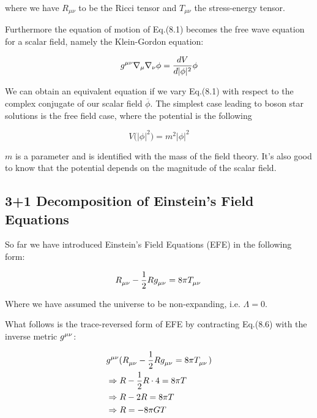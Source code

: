\documentclass[12pt]{article}
\numberwithin{equation}{section}
\numberwithin{theorem}{subsection}
\begin{document}
where we have $R_{\mu\nu}$ to be the Ricci tensor and $T_{\mu\nu}$ the stress-energy tensor.

\newline

Furthermore the equation of motion of Eq.(8.1) becomes the free wave equation for a scalar field, namely the Klein-Gordon equation:

\begin{equation}

    \tensor{g}{^\mu^\nu}\nabla_{\mu}\nabla_{\nu}\phi = \frac{dV}{d|\phi|^{2}}\phi

\end{equation}

We can obtain an equivalent equation if we vary Eq.(8.1) with respect to the complex conjugate of our scalar field $\overline{\phi}$. The simplest case leading to boson star solutions is the free field case, where the potential is the following

\begin{equation}

    V\big(|\phi|^{2} \big) = m^{2}|\phi|^{2}

\end{equation}

$m$ is a parameter and is identified with the mass of the field theory. It's also good to know that the potential depends on the magnitude of the scalar field.


\subsection{3+1 Decomposition of Einstein's Field Equations} So far we have introduced Einstein's Field Equations (EFE) in the following form:

\begin{equation}

    \tensor{R}{_\mu_\nu}-\frac{1}{2}R\tensor{g}{_\mu_\nu}=8\pi \tensor{T}{_\mu_\nu}

\end{equation}

Where we have assumed the universe to be non-expanding, i.e. $\Lambda = 0$.

What follows is the trace-reversed form of EFE by contracting Eq.(8.6) with the inverse metric $\tensor{g}{^\mu^\nu}$:

\begin{align}

    &\tensor{g}{^\mu^\nu}(\tensor{R}{_\mu_\nu}-\frac{1}{2}R\tensor{g}{_\mu_\nu} = 8\pi \tensor{T}{_\mu_\nu}) \notag \\

    &\Rightarrow R - \frac{1}{2} R \cdot 4 = 8\pi T \notag \\

    &\Rightarrow R - 2R = 8\pi T \notag \\

    &\Rightarrow R = -8\pi G T

\end{align}
\end{document}
